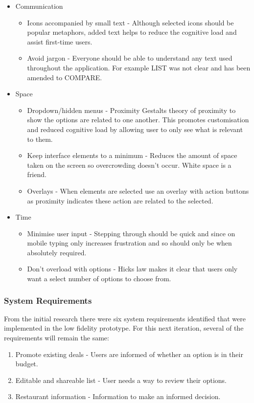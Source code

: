 \documentclass[a4 paper, 12pt]{article}
\begin{document}
\begin{itemize}
            \item Communication 
            \begin{itemize}
                \item Icons accompanied by small text - Although selected icons should be popular metaphors, added text helps to reduce the cognitive load and assist first-time users.
                \item Avoid jargon - Everyone should be able to understand any text used throughout the application. For example LIST was not clear and has been amended to COMPARE.
            \end{itemize}
            
            \item Space 
                \begin{itemize}
                    \item Dropdown/hidden menus - Proximity Gestalts theory of proximity to show the options are related to one another. This promotes customisation and reduced cognitive load by allowing user to only see what is relevant to them.
                    \item Keep interface elements to a minimum - Reduces the amount of space taken on the screen so overcrowding doesn't occur. White space is a friend.
                    \item Overlays - When elements are selected use an overlay with action buttons as proximity indicates these action are related to the selected.
                \end{itemize}
            \item Time
                \begin{itemize}
                    \item Minimise user input - Stepping through should be quick and since on mobile typing only increases frustration and so should only be when absolutely required.
                    \item Don't overload with options - Hicks law makes it clear that users only want a select number of options to choose from.
                \end{itemize}
                   
           \end{itemize}    

    \subsubsection*{System Requirements}
    From the initial research there were six system requirements identified that were implemented in the low fidelity prototype. For this next iteration, several of the requirements will remain the same:
    \begin{enumerate}
        \item Promote existing deals - Users are informed of whether an option is in their budget.
        \item Editable and shareable list - User needs a way to review their options.
        \item Restaurant information - Information to make an informed decision.
    \end{enumerate}      
\end{document}
